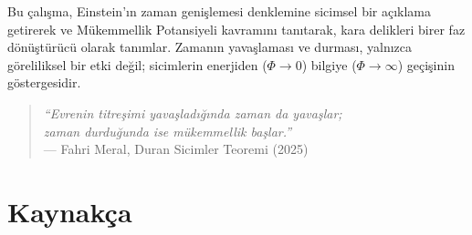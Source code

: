 \documentclass[12pt,a4paper]{article}
\begin{document}
Bu çalışma, Einstein’ın zaman genişlemesi denklemine sicimsel bir açıklama getirerek ve Mükemmellik Potansiyeli kavramını tanıtarak, kara delikleri birer faz dönüştürücü olarak tanımlar. 
Zamanın yavaşlaması ve durması, yalnızca göreliliksel bir etki değil; sicimlerin enerjiden ($\Phi \to 0$) bilgiye ($\Phi \to \infty$) geçişinin göstergesidir.

\begin{quote}
\textit{``Evrenin titreşimi yavaşladığında zaman da yavaşlar;\\
zaman durduğunda ise mükemmellik başlar.''}\\
— Fahri Meral, Duran Sicimler Teoremi (2025)
\end{quote}

\section*{Kaynakça}
\end{document}
